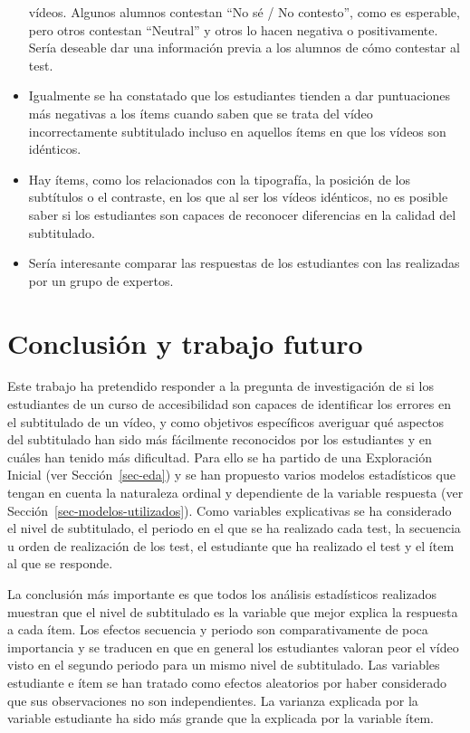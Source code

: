 \documentclass[
  12pt,
  a4paper,
  extrafontsizes,
  onecolumn,
  openright,
  table]{memoir}
\begin{document}
\begin{itemize}
  vídeos. Algunos alumnos contestan \enquote{No sé / No contesto}, como
  es esperable, pero otros contestan \enquote{Neutral} y otros lo hacen
  negativa o positivamente. Sería deseable dar una información previa a
  los alumnos de cómo contestar al test.
\item
  Igualmente se ha constatado que los estudiantes tienden a dar
  puntuaciones más negativas a los ítems cuando saben que se trata del
  vídeo incorrectamente subtitulado incluso en aquellos ítems en que los
  vídeos son idénticos.
\item
  Hay ítems, como los relacionados con la tipografía, la posición de los
  subtítulos o el contraste, en los que al ser los vídeos idénticos, no
  es posible saber si los estudiantes son capaces de reconocer
  diferencias en la calidad del subtitulado.
\item
  Sería interesante comparar las respuestas de los estudiantes con las
  realizadas por un grupo de expertos.
\end{itemize}


\hypertarget{sec-conclusion}{%
\chapter{Conclusión y trabajo futuro}\label{sec-conclusion}}

Este trabajo ha pretendido responder a la pregunta de investigación de
si los estudiantes de un curso de \gls{accesibilidad} son capaces de
identificar los errores en el subtitulado de un vídeo, y como objetivos
específicos averiguar qué aspectos del subtitulado han sido más
fácilmente reconocidos por los estudiantes y en cuáles han tenido más
dificultad. Para ello se ha partido de una Exploración Inicial (ver
Sección~\ref{sec-eda}) y se han propuesto varios modelos estadísticos
que tengan en cuenta la naturaleza ordinal y dependiente de la variable
respuesta (ver Sección~\ref{sec-modelos-utilizados}). Como variables
explicativas se ha considerado el nivel de subtitulado, el periodo en el
que se ha realizado cada test, la secuencia u orden de realización de
los test, el estudiante que ha realizado el test y el ítem al que se
responde.

La conclusión más importante es que todos los análisis estadísticos
realizados muestran que el nivel de subtitulado es la variable que mejor
explica la respuesta a cada ítem. Los efectos secuencia y periodo son
comparativamente de poca importancia y se traducen en que en general los
estudiantes valoran peor el vídeo visto en el segundo periodo para un
mismo nivel de subtitulado. Las variables estudiante e ítem se han
tratado como efectos aleatorios por haber considerado que sus
observaciones no son independientes. La varianza explicada por la
variable estudiante ha sido más grande que la explicada por la variable
ítem.
\end{document}

